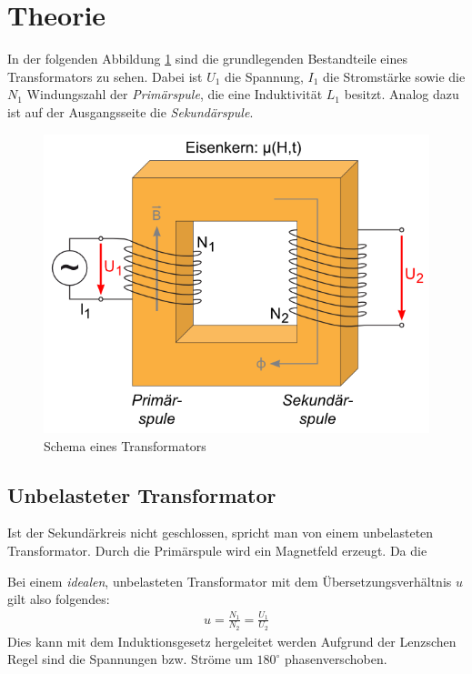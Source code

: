 \documentclass[12pt,a4paper,titlepage,headinclude,bibtotoc]{scrartcl}
\begin{document}
\section{Theorie}
\label{sec:theorie}
In der folgenden Abbildung \ref{fig:TrafoSchema} sind die grundlegenden Bestandteile eines Transformators zu sehen.
Dabei ist $U_1$ die Spannung, $I_1$ die Stromstärke sowie die $N_1$ Windungszahl der \textit{Primärspule}, die eine Induktivität $L_1$ besitzt.
Analog dazu ist auf der Ausgangsseite die \textit{Sekundärspule}.
\begin{figure}[!htb]
	\centering
	\includegraphics[scale=0.75]{TrafoSchema.png}
	\caption{Schema eines Transformators \protect\footnotemark}
	\label{fig:TrafoSchema}
\end{figure}

\subsection{Unbelasteter Transformator}
Ist der Sekundärkreis nicht geschlossen, spricht man von einem unbelasteten Transformator.
Durch die Primärspule wird ein Magnetfeld erzeugt.
Da die

Bei einem \textit{idealen}, unbelasteten Transformator mit dem Übersetzungsverhältnis $u$ gilt also folgendes:
\begin{align}
	u=\frac{N_1}{N_2}=\frac{U_1}{U_2}
	\label{eq:u}  
\end{align}
Dies kann mit dem Induktionsgesetz hergeleitet werden
Aufgrund der Lenzschen Regel sind die Spannungen bzw. Ströme um $180^\circ$ phasenverschoben.
\end{document}
